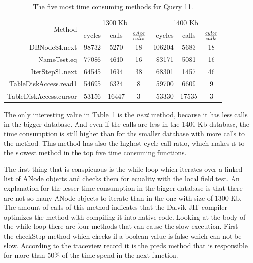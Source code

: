 \begin {table}[htpb] 
  \begin{center}
\begin {tabular} {|r|r|c|c|r|c|c|}
  	\hline
	\multirow{2}{*}{Method}&\multicolumn{3}{c}{1300 Kb}&\multicolumn{3}{|c|}{1400 Kb}\\
	\cline{2-7}
	&cycles&calls&${cylce \over calls}$&cycles&calls&${cylce \over calls}$\\
	\hline
	\hline
	DBNode\$4.next&98732&5270&18&106204&5683&18\\
	\hline
	NameTest.eq&77086&4640&16&83171&5081&16\\
	\hline
	IterStep\$1.next&64545&1694&38&68301&1457&46\\
	\hline
	TableDiskAccess.read1&54695&6324&8&59700&6609&9\\
	\hline
	TableDiskAccess.cursor&53156&16447&3&53330&17535&3\\
	\hline
\end {tabular}
\caption {The five most time consuming methods for Query 11.}
\label {tab:traceview-q11-methods}
\end{center}
\end {table}

The only interesting value in Table~\ref{tab:traceview-q11-methods} is the \textit{next} method, because it has less calls in the bigger database.
And even if the calls are less in the 1400 Kb database, the time consumption is still higher than for the smaller database with more calls to the method.
This method has also the highest cycle call ratio, which makes it to the slowest method in the top five time consuming functions.

The first thing that is conspicuous is the while-loop which iterates over a linked list of \textsf{ANode} objects and checks them for equality with the local field \textsf{test}.
An explanation for the lesser time consumption in the bigger database is that there are not so many \textsf{ANode} objects to iterate than in the one with size of 1300 Kb. 
The amount of calls of this method indicates that the Dalvik JIT compiler optimizes the method with compiling it into native code.
Looking at the body of the while-loop there are four methods that can cause the slow execution.
First the \textsf{checkStop} method which checks if a boolean value is false which can not be slow.
According to the traceview record it is the \textsf{preds} method that is responsible for more than 50\% of the time spend in the \textsf{next} function.


